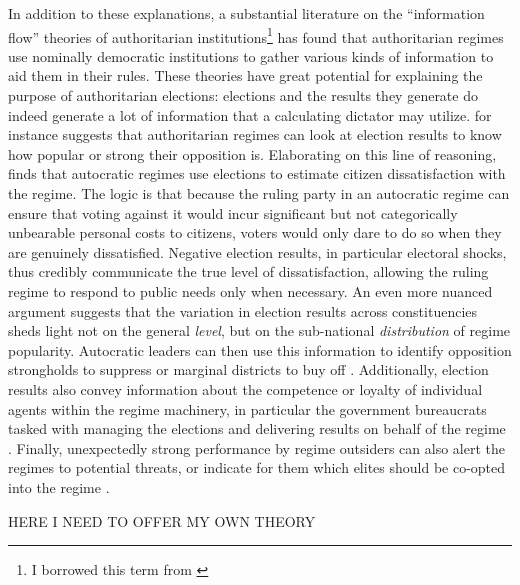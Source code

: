 \documentclass[12pt]{article}\usepackage[]{graphicx}\usepackage[]{color}
\newcommand{\1}{\mathbbm{1}}
\begin{document}
In addition to these explanations, a substantial literature on the ``information flow'' theories of authoritarian institutions\footnote{I borrowed this term from \cite{Hou2017}} has found that authoritarian regimes use nominally democratic institutions to gather various kinds of information to aid them in their rules. These theories have great potential for explaining the purpose of authoritarian elections: elections and the results they generate do indeed generate a lot of information that a calculating dictator may utilize. \cite{Geddes2005} for instance suggests that authoritarian regimes can look at election results to know how popular or strong their opposition is. Elaborating on this line of reasoning, \cite{Miller2015} finds that autocratic regimes use elections to estimate citizen dissatisfaction with the regime. The logic is that because the ruling party in an autocratic regime can ensure that voting against it would incur significant but not categorically unbearable personal costs to citizens, voters would only dare to do so when they are genuinely dissatisfied. Negative election results, in particular electoral shocks, thus credibly communicate the true level of dissatisfaction, allowing the ruling regime to respond to public needs only when necessary. An even more nuanced argument suggests that the variation in election results across constituencies sheds light not on the general \textit{level}, but on the sub-national \textit{distribution} of regime popularity. Autocratic leaders can then use this information to identify opposition strongholds to suppress \citep{Magaloni2006, Blaydes2008} or marginal districts to buy off \citep{Reed2001, Magaloni2006}. Additionally, election results also convey information about the competence or loyalty of individual agents within the regime machinery, in particular the government bureaucrats tasked with managing the elections and delivering results on behalf of the regime \citep{Magaloni2006, Blaydes2008, Myagkov2009, RundlettSvolik2016}. Finally, unexpectedly strong performance by regime outsiders can also alert the regimes to potential threats, or indicate for them which elites should be co-opted into the regime \cite{LustOkar2005}.

HERE I NEED TO OFFER MY OWN THEORY
\end{document}
